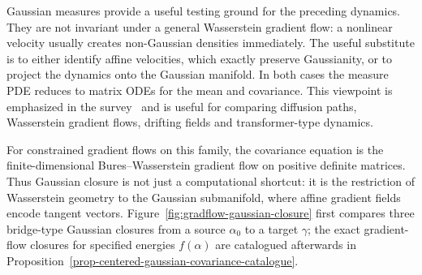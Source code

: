 Gaussian measures provide a useful testing ground for the preceding dynamics. They are not invariant under a general Wasserstein gradient flow: a nonlinear velocity usually creates non-Gaussian densities immediately. The useful substitute is to either identify affine velocities, which exactly preserve Gaussianity, or to project the dynamics onto the Gaussian manifold. In both cases the measure PDE reduces to matrix ODEs for the mean and covariance. This viewpoint is emphasized in the survey~\cite{Peyre2026OptimalDiffusionTransports} and is useful for comparing diffusion paths, Wasserstein gradient flows, drifting fields and transformer-type dynamics.

For constrained gradient flows on this family, the covariance equation is the finite-dimensional Bures--Wasserstein gradient flow on positive definite matrices. Thus Gaussian closure is not just a computational shortcut: it is the restriction of Wasserstein geometry to the Gaussian submanifold, where affine gradient fields encode tangent vectors. Figure~\ref{fig:gradflow-gaussian-closure} first compares three bridge-type Gaussian closures from a source \(\alpha_0\) to a target \(\gamma\); the exact gradient-flow closures for specified energies \(f(\alpha)\) are catalogued afterwards in Proposition~\ref{prop-centered-gaussian-covariance-catalogue}.

